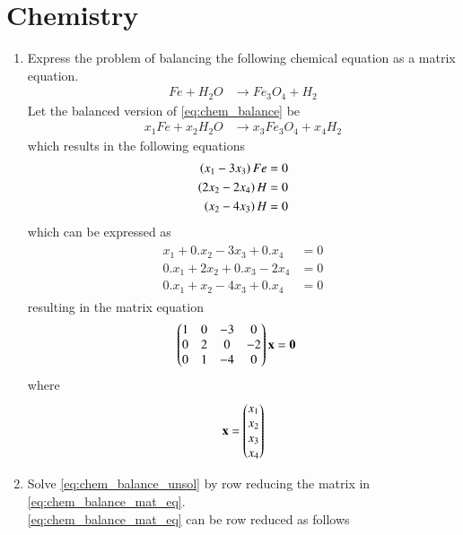 \documentclass[journal,12pt,twocolumn]{IEEEtran}
\renewcommand\thesection{\arabic{section}}
\begin{document}
\section{Chemistry}
\begin{enumerate}[label=\arabic*.,ref=\thesection.\theenumi]
\item Express the problem of balancing the following chemical equation as a matrix equation.
%
\begin{align}
\label{eq:chem_balance}
Fe+H_2O &\rightarrow Fe_3O_4 + H_2
\end{align}
%
\solution Let the balanced version of \eqref{eq:chem_balance} be 
%
\begin{align}
\label{eq:chem_balance_unsol}
x_1Fe+x_2H_2 O &\rightarrow x_3Fe_3 O_4 + x_4H_2
\end{align}
%
which results in the following equations
%
\begin{align}
\begin{split}
\left(x_1 -3x_3\right)Fe &= 0
\\
\left(2x_2 -2x_4\right)H &= 0
\\
\left(x_2 -4x_3\right)H &= 0
\end{split}
\end{align}
which can be expressed as
\begin{align}
\begin{split}
x_1 + 0.x_2 -3x_3 +0.x_4&= 0
\\
0.x_1+2x_2 +0.x_3-2x_4 &= 0
\\
0.x_1+x_2 -4x_3+ 0.x_4 &= 0
\end{split}
\end{align}
%
resulting in the matrix equation
\begin{align}
\label{eq:chem_balance_mat_eq}
\begin{split}
\begin{pmatrix}
1 & 0 & -3 & 0
\\
0 & 2 & 0 & -2
\\
0 & 1 & -4 & 0
\end{pmatrix}
\mathbf{x} &= \mathbf{0}
\end{split}
\end{align}
%
where
\begin{align}
\mathbf{x} = \begin{pmatrix}x_1 \\ x_2 \\ x_3 \\ x_4\end{pmatrix} 
\end{align}
\item Solve \eqref{eq:chem_balance_unsol} by row reducing 
the matrix in \eqref{eq:chem_balance_mat_eq}.
\\
\solution  \eqref{eq:chem_balance_mat_eq} can be row reduced as follows

\end{enumerate}
\end{document}
